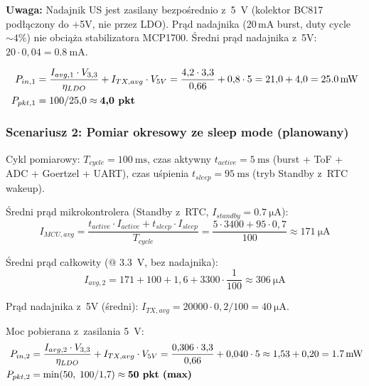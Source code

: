 \documentclass[a4paper,11pt]{article}
\begin{document}
	\textbf{Uwaga:} Nadajnik US jest zasilany bezpośrednio z~\SI{5}{\volt}
	(kolektor BC817 podłączony do +5V, nie przez LDO). Prąd nadajnika
	(20\,mA burst, duty cycle ${\sim}4\%$) nie obciąża stabilizatora MCP1700.
	Średni prąd nadajnika z~5V: $20 \cdot 0{,}04 = \SI{0,8}{\milli\ampere}$.
	
	\begin{align}
		P_{in,1} &= \frac{I_{avg,1} \cdot V_{3,3}}{\eta_{LDO}} + I_{TX,avg} \cdot V_{5V}
		= \frac{4{,}2 \cdot 3{,}3}{0{,}66} + 0{,}8 \cdot 5 = 21{,}0 + 4{,}0 = \SI{25,0}{\milli\watt} \notag \\
		P_{pkt,1} &= 100/25{,}0 \approx \textbf{4,0~pkt} \notag
	\end{align}
	
	\subsubsection{Scenariusz 2: Pomiar okresowy ze sleep mode (planowany)}
	
	Cykl pomiarowy: $T_{cycle} = \SI{100}{\milli\second}$, czas aktywny
	$t_{active} = \SI{5}{\milli\second}$ (burst + ToF + ADC + Goertzel + UART),
	czas uśpienia $t_{sleep} = \SI{95}{\milli\second}$ (tryb Standby z~RTC wakeup).
	
	Średni prąd mikrokontrolera (Standby z~RTC, $I_{standby} = \SI{0,7}{\micro\ampere}$):
	\begin{equation}
		I_{MCU,avg} = \frac{t_{active} \cdot I_{active} + t_{sleep} \cdot I_{sleep}}{T_{cycle}}
		= \frac{5 \cdot 3400 + 95 \cdot 0{,}7}{100} \approx \SI{171}{\micro\ampere}
		\label{eq:imcu_avg}
	\end{equation}
	
	Średni prąd całkowity (@ \SI{3,3}{\volt}, bez nadajnika):
	\begin{equation}
		I_{avg,2} = 171 + 100 + 1{,}6 + 3300 \cdot \frac{1}{100}
		\approx \SI{306}{\micro\ampere}
	\end{equation}
	
	Prąd nadajnika z~5V (średni): $I_{TX,avg} = 20000 \cdot 0{,}2 / 100 = \SI{40}{\micro\ampere}$.
	
	Moc pobierana z~zasilania \SI{5}{\volt}:
	\begin{align}
		P_{in,2} &= \frac{I_{avg,2} \cdot V_{3,3}}{\eta_{LDO}} + I_{TX,avg} \cdot V_{5V}
		= \frac{0{,}306 \cdot 3{,}3}{0{,}66} + 0{,}040 \cdot 5
		\approx 1{,}53 + 0{,}20 = \SI{1,7}{\milli\watt} \label{eq:moc_scen2} \\
		P_{pkt,2} &= \min(50,\; 100/1{,}7) \approx \textbf{50~pkt~(max)} \notag
	\end{align}
	
\end{document}

